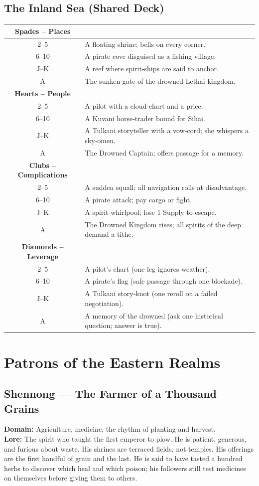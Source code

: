 \documentclass[12pt]{book}
\begin{document}
\section{The Inland Sea (Shared Deck)}
\begin{longtable}{c X}
\toprule
\textbf{Spades -- Places} & \\
\midrule
2--5   & A floating shrine; bells on every corner. \\
6--10 & A pirate cove disguised as a fishing village. \\
J--K  & A reef where spirit‑ships are said to anchor. \\
A    & The sunken gate of the drowned Lethai kingdom. \\
\midrule
\textbf{Hearts -- People} & \\
\midrule
2--5   & A pilot with a cloud‑chart and a price. \\
6--10 & A Kuvani horse‑trader bound for Sihai. \\
J--K  & A Tulkani storyteller with a vow‑cord; she whispers a sky‑omen. \\
A    & The Drowned Captain; offers passage for a memory. \\
\midrule
\textbf{Clubs -- Complications} & \\
\midrule
2--5   & A sudden squall; all navigation rolls at disadvantage. \\
6--10 & A pirate attack; pay cargo or fight. \\
J--K  & A spirit‑whirlpool; lose 1 Supply to escape. \\
A    & The Drowned Kingdom rises; all spirits of the deep demand a tithe. \\
\midrule
\textbf{Diamonds -- Leverage} & \\
\midrule
2--5   & A pilot's chart (one leg ignores weather). \\
6--10 & A pirate's flag (safe passage through one blockade). \\
J--K  & A Tulkani story‑knot (one reroll on a failed negotiation). \\
A    & A memory of the drowned (ask one historical question; answer is true). \\
\bottomrule
\end{longtable}

\chapter{Patrons of the Eastern Realms}

\section{Shennong --- The Farmer of a Thousand Grains}
\noindent\textbf{Domain:} Agriculture, medicine, the rhythm of planting and harvest.\\
\textbf{Lore:} The spirit who taught the first emperor to plow. He is patient, generous, and furious about waste. His shrines are terraced fields, not temples. His offerings are the first handful of grain and the last. He is said to have tasted a hundred herbs to discover which heal and which poison; his followers still test medicines on themselves before giving them to others.
\end{document}
